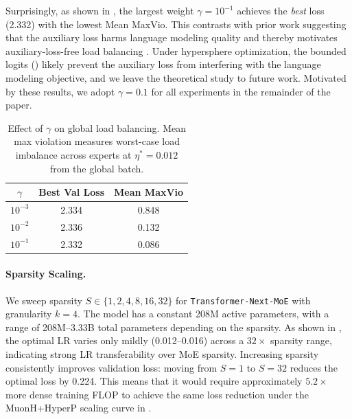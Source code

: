 \documentclass{article}
\begin{document}
Surprisingly, as shown in , the largest weight $\gamma = 10^{-1}$ achieves the \emph{best} loss (2.332) with the lowest Mean MaxVio. This contrasts with prior work suggesting that the auxiliary loss harms language modeling quality and thereby motivates auxiliary-loss-free load balancing \cite{lin2024auxloss}. Under hypersphere optimization, the bounded logits () likely prevent the auxiliary loss from interfering with the language modeling objective, and we leave the theoretical study to future work. Motivated by these results, we adopt $\gamma = 0.1$ for all experiments in the remainder of the paper.





\begin{table}[H]
\centering
\caption{Effect of $\gamma$ on global load balancing. Mean max violation measures worst-case load imbalance across experts at $\eta^* = 0.012$ from the global batch. }
\label{tab:load-balance}
\vspace{0.1cm}
\begin{tabular}{ccc}
\toprule
$\gamma$ & \textbf{Best Val Loss} & \textbf{Mean MaxVio} \\
\midrule
$10^{-3}$ & 2.334 & 0.848 \\
$10^{-2}$ & 2.336 & 0.132 \\
$10^{-1}$ & 2.332 & 0.086 \\
\bottomrule
\end{tabular}
\end{table}










\paragraph{Sparsity Scaling.}\label{sec:sparsity}
We sweep sparsity $S \in \{1, 2, 4, 8, 16, 32\}$ for \texttt{Transformer-Next-MoE} with granularity $k=4$. The model has a constant 208M active parameters, with a range of 208M--3.33B total parameters depending on the sparsity. As shown in , the optimal LR varies only mildly (0.012--0.016) across a $32\times$ sparsity range, indicating strong LR transferability over MoE sparsity. Increasing sparsity consistently improves validation loss: moving from $S{=}1$ to $S{=}32$ reduces the optimal loss by 0.224. This means that it would require approximately $5.2\times$ more dense training FLOP to achieve the same loss reduction under the MuonH+HyperP scaling curve in .
\end{document}
